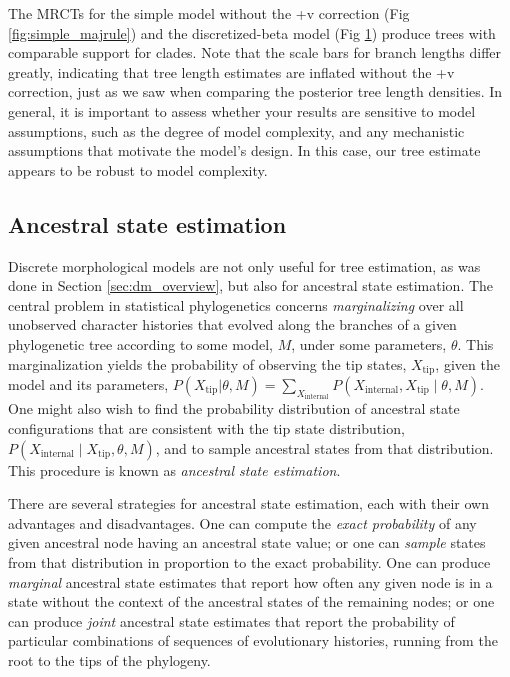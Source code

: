 \begin{figure}[h!]
\label{fig:mk_discretized_majrule}
\end{figure}

The MRCTs for the simple model without the +v correction (Fig \ref{fig:simple_majrule}) and the discretized-beta model (Fig \ref{fig:mk_discretized_majrule}) produce trees with comparable support for clades.
Note that the scale bars for branch lengths differ greatly, indicating that tree length estimates are inflated without the +v correction, just as we saw when comparing the posterior tree length densities.
In general, it is important to assess whether your results are sensitive to model assumptions, such as the degree of model complexity, and any mechanistic assumptions that motivate the model's design.
In this case, our tree estimate appears to be robust to model complexity.

\subsection{Ancestral state estimation} \label{sec:anc_states}

Discrete morphological models are not only useful for tree estimation, as was done in Section \ref{sec:dm_overview}, but also for ancestral state estimation.
The central problem in statistical phylogenetics concerns {\it marginalizing} over all unobserved character histories that evolved along the branches of a given phylogenetic tree according to some model, $M$, under some parameters, $\theta$.
This marginalization yields the probability of observing the tip states, $X_\text{tip}$, given the model and its parameters, $P( X_\text{tip} | \theta, M ) = \sum_{X_\text{internal}} P( X_\text{internal}, X_\text{tip} \mid \theta, M )$.
One might also wish to find the probability distribution of ancestral state configurations that are consistent with the tip state distribution, $P( X_\text{internal} \mid X_\text{tip}, \theta, M )$, and to sample ancestral states from that distribution.
This procedure is known as {\it ancestral state estimation}.

There are several strategies for ancestral state estimation, each with their own advantages and disadvantages.
One can compute the {\it exact probability} of any given ancestral node having an ancestral state value; or one can {\it sample} states from that distribution in proportion to the exact probability.
One can produce {\it marginal} ancestral state estimates that report how often any given node is in a state without the context of the ancestral states of the remaining nodes; or one can produce {\it joint} ancestral state estimates that report the probability of particular combinations of sequences of evolutionary histories, running from the root to the tips of the phylogeny.

